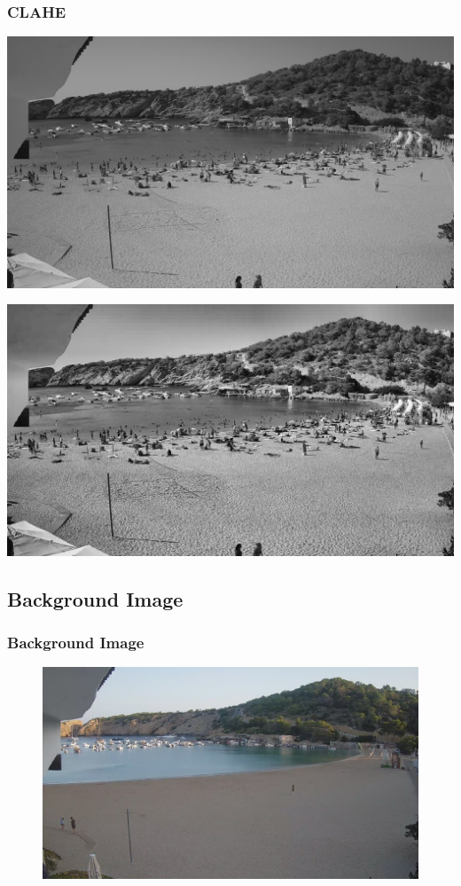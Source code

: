 \documentclass{beamer}
\begin{document}
\begin{frame}
    \frametitle{CLAHE}
    \centering
    \includegraphics[width=\textwidth]{../gen/gray/1660316400.jpg}
  
\end{frame}

\begin{frame}
    \centering
    \includegraphics[width=\textwidth]{../gen/equ/1660316400.jpg} 
\end{frame}

\subsection*{Background Image}
\begin{frame}
    \frametitle{Background Image}

    \begin{figure}
        \centering
        \includegraphics[width=\textwidth]{../Gelabert/1660284000.jpg}
    \end{figure}

\end{frame}
\end{document}
